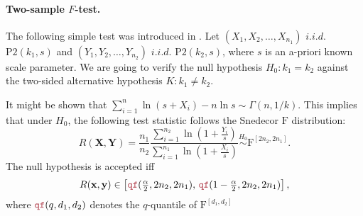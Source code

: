 \documentclass[11pt]{article}\usepackage[]{graphicx}\usepackage[]{color}
\newcommand{\hlkwd}[1]{\textcolor[rgb]{0.737,0.353,0.396}{\textbf{#1}}}%
\newcommand{\Rfunc}[1]{\texttt{\hlkwd{#1}}}
\newcommand{\vect}[1]{{\mathbf{#1}}}
\theoremstyle{remark}
\theoremstyle{definition}
\begin{document}
%
%



\paragraph{Two-sample $F$-test.}
The following simple test was introduced in \cite{Gagolewski2011:PhD}.
Let
$(X_1,X_2,\dots,X_{n_1})$ $i.i.d.$ $\mathrm{P2}(k_1,s)$ and
$(Y_1,Y_2,\dots,Y_{n_2})$ $i.i.d.$ $\mathrm{P2}(k_2,s)$,
where $s$ is an a-priori known scale parameter.
We are going to verify the null hypothesis
$H_0: k_1=k_2$ against the two-sided alternative hypothesis
$K: k_1\neq k_2$.


It might be shown that  $\sum_{i=1}^n \ln(s+X_i)-n\ln s\sim\Gamma(n,1/k)$.
This implies that under $H_0$, the following test statistic
follows the Snedecor $\mathrm{F}$ distribution:
\begin{equation}
R(\vect{X},\vect{Y})=\dfrac{n_1}{n_2}
   \dfrac{\sum_{i=1}^{n_2} \ln\left(1+\frac{Y_i}{s}\right)}
         {\sum_{i=1}^{n_1} \ln\left(1+\frac{X_i}{s}\right)}
\stackrel{H_0}{\sim}\mathrm{F}^{[2n_2,2n_1]}.
\end{equation}
The null hypothesis is accepted iff
\[
R(\vect{x},\vect{y})\in\left[\text{\Rfunc{qf}}(\tfrac{\alpha}{2},2n_2,2n_1),\,
\text{\Rfunc{qf}}(1-\tfrac{\alpha}{2},2n_2,2n_1)\right],
\]
where $\text{\Rfunc{qf}}(q,d_1,d_2)$ denotes the $q$-quantile
of $\mathrm{F}^{[d_1,d_2]}$
\end{document}
